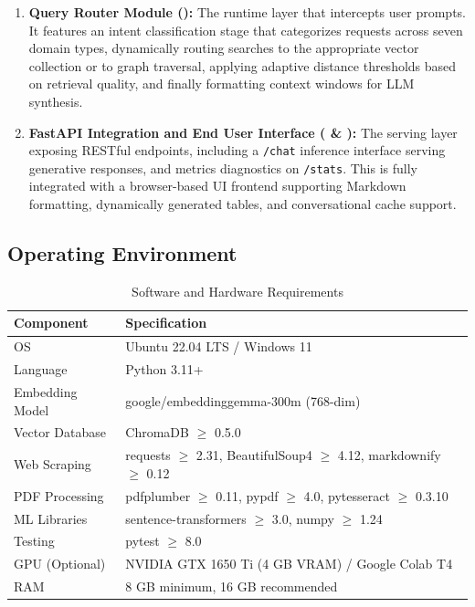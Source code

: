 \documentclass[12pt,a4paper]{report}
\begin{document}
\begin{enumerate}
  \item \textbf{Query Router Module ():} The runtime layer that intercepts user prompts. It features an intent classification stage that categorizes requests across seven domain types, dynamically routing searches to the appropriate vector collection or to graph traversal, applying adaptive distance thresholds based on retrieval quality, and finally formatting context windows for LLM synthesis.
  \item \textbf{FastAPI Integration and End User Interface ( \& ):} The serving layer exposing RESTful endpoints, including a \texttt{/chat} inference interface serving generative responses, and metrics diagnostics on \texttt{/stats}. This is fully integrated with a browser-based UI frontend supporting Markdown formatting, dynamically generated tables, and conversational cache support.
\end{enumerate}

\subsection{Operating Environment}

\begin{table}[htbp]
  \centering
    \vspace*{5pt}
  \small
  \begin{tabular}{|L{3.2cm}|L{8.8cm}|}
    \hline
    \textbf{Component} & \textbf{Specification} \\ \hline
    OS & Ubuntu 22.04 LTS / Windows 11 \\ \hline
    Language & Python 3.11+ \\ \hline
    Embedding Model & google/embeddinggemma-300m (768-dim) \\ \hline
    Vector Database & ChromaDB $\geq$ 0.5.0 \\ \hline
    Web Scraping & requests $\geq$ 2.31, BeautifulSoup4 $\geq$ 4.12, markdownify $\geq$ 0.12 \\ \hline
    PDF Processing & pdfplumber $\geq$ 0.11, pypdf $\geq$ 4.0, pytesseract $\geq$ 0.3.10 \\ \hline
    ML Libraries & sentence-transformers $\geq$ 3.0, numpy $\geq$ 1.24 \\ \hline
    Testing & pytest $\geq$ 8.0 \\ \hline
    GPU (Optional) & NVIDIA GTX 1650 Ti (4 GB VRAM) / Google Colab T4 \\ \hline
    RAM & 8 GB minimum, 16 GB recommended \\ \hline
  \end{tabular}
  \caption{Software and Hardware Requirements}
  \label{tab:requirements}

\end{table}
\clearpage
\end{document}
